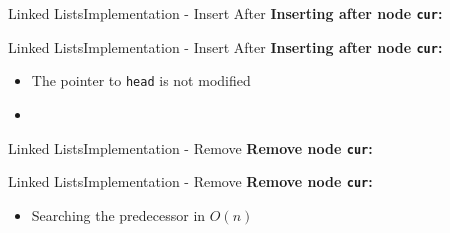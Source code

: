 
\begin{frame}{Linked Lists}{Implementation - Insert After}
  \textbf{Inserting after node \texttt{cur}:}
  \begin{flushleft}
    
  \end{flushleft}
\end{frame}


\begin{frame}[fragile]{Linked Lists}{Implementation - Insert After}
  \textbf{Inserting after node \texttt{cur}:}
  \begin{itemize}
    \item<2->
      The pointer to \texttt{head} is not modified
    \item<3->
      
  \end{itemize}
\end{frame}


\begin{frame}{Linked Lists}{Implementation - Remove}
  \textbf{Remove node \texttt{cur}:}
  \begin{flushleft}
    
  \end{flushleft}
\end{frame}



\begin{frame}[fragile]{Linked Lists}{Implementation - Remove}
  \textbf{Remove node \texttt{cur}:}
  \begin{itemize}
    \item<2->
      Searching the predecessor in $O(n)$
      
  \end{itemize}
\end{frame}

